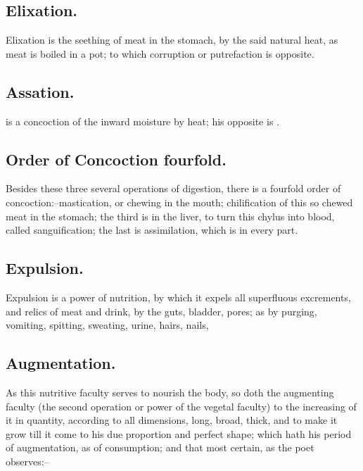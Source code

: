\subsection{Elixation.}

Elixation is the seething of meat in the stomach, by
the said natural heat, as meat is boiled in a pot; to which corruption or
putrefaction is opposite.

\subsection{Assation.}

 is a concoction of the inward moisture by heat; his opposite is
.

\subsection{Order of Concoction fourfold.}

Besides these three several operations of digestion, there is a fourfold order
of concoction:--mastication, or chewing in the mouth; chilification of this so
chewed meat in the stomach; the third is in the liver, to turn this chylus into
blood, called sanguification; the last is assimilation, which is in every part.

\subsection{Expulsion.}

Expulsion is a power of nutrition, by which it expels all superfluous
excrements, and relics of meat and drink, by the guts, bladder, pores; as by
purging, vomiting, spitting, sweating, urine, hairs, nails, \etc{}

\subsection{Augmentation.}

As this nutritive faculty serves to nourish the body, so doth the augmenting
faculty (the second operation or power of the vegetal faculty) to the
increasing of it in quantity, according to all dimensions, long, broad, thick,
and to make it grow till it come to his due proportion and perfect shape; which
hath his period of augmentation, as of consumption; and that most certain, as
the poet observes:--


